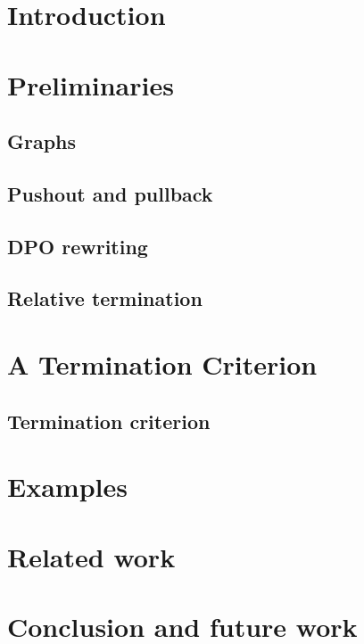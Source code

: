 
\section{Introduction}
\label{sec:intro}


\section{Preliminaries}
\label{sec:pre} 

\subsection{Graphs}
 
\subsection{Pushout and pullback}  

\subsection{DPO rewriting} 

\subsection{Relative termination}

   
\section{A Termination Criterion} 
\label{sec:termination_criterion}
 
 
\subsection{Termination criterion}
\label{sec:termination} 

 

\section{Examples}
\label{sec:examples}


 
\section{Related work}
\label{sec:related_work} 


\section{Conclusion and future work}
\label{sec:conclusion} 
